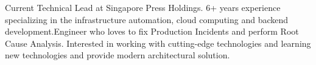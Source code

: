 

\begin{cvparagraph}

Current Technical Lead at Singapore Press Holdings. 6+ years experience specializing in the infrastructure automation, cloud computing and backend development.Engineer who loves to fix Production Incidents and perform Root Cause Analysis. Interested in working with cutting-edge technologies and learning new technologies and provide modern architectural solution.
\end{cvparagraph}
